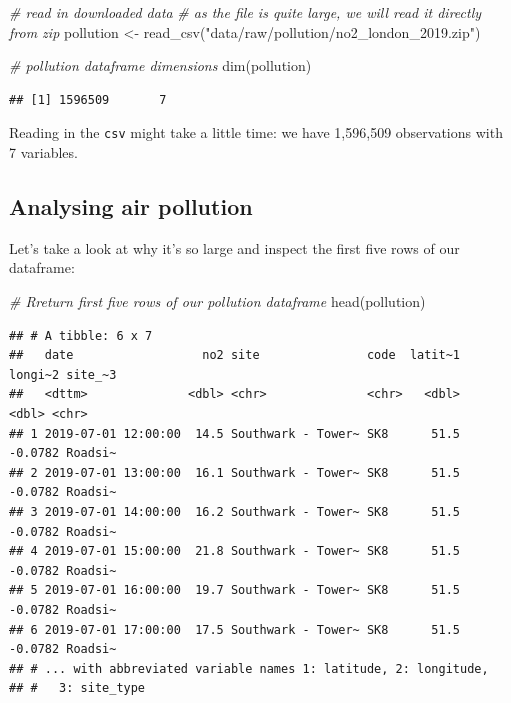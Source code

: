 \documentclass[
]{book}
\newenvironment{Shaded}{\begin{snugshade}}{\end{snugshade}}
\newcommand{\CommentTok}[1]{\textcolor[rgb]{0.56,0.35,0.01}{\textit{#1}}}
\newcommand{\FunctionTok}[1]{\textcolor[rgb]{0.00,0.00,0.00}{#1}}
\newcommand{\NormalTok}[1]{#1}
\newcommand{\OtherTok}[1]{\textcolor[rgb]{0.56,0.35,0.01}{#1}}
\newcommand{\StringTok}[1]{\textcolor[rgb]{0.31,0.60,0.02}{#1}}
\begin{document}
\begin{Shaded}
\begin{Highlighting}[]
\CommentTok{\# read in downloaded data}
\CommentTok{\# as the file is quite large, we will read it directly from zip}
\NormalTok{pollution }\OtherTok{\textless{}{-}} \FunctionTok{read\_csv}\NormalTok{(}\StringTok{"data/raw/pollution/no2\_london\_2019.zip"}\NormalTok{)}

\CommentTok{\# pollution dataframe dimensions}
\FunctionTok{dim}\NormalTok{(pollution)}
\end{Highlighting}
\end{Shaded}

\begin{verbatim}
## [1] 1596509       7
\end{verbatim}

Reading in the \texttt{csv} might take a little time: we have 1,596,509 observations with 7 variables.

\hypertarget{analysing-air-pollution}{%
\subsection{Analysing air pollution}\label{analysing-air-pollution}}

Let's take a look at why it's so large and inspect the first five rows of our dataframe:

\begin{Shaded}
\begin{Highlighting}[]
\CommentTok{\# Rreturn first five rows of our pollution dataframe}
\FunctionTok{head}\NormalTok{(pollution)}
\end{Highlighting}
\end{Shaded}

\begin{verbatim}
## # A tibble: 6 x 7
##   date                  no2 site               code  latit~1 longi~2 site_~3
##   <dttm>              <dbl> <chr>              <chr>   <dbl>   <dbl> <chr>  
## 1 2019-07-01 12:00:00  14.5 Southwark - Tower~ SK8      51.5 -0.0782 Roadsi~
## 2 2019-07-01 13:00:00  16.1 Southwark - Tower~ SK8      51.5 -0.0782 Roadsi~
## 3 2019-07-01 14:00:00  16.2 Southwark - Tower~ SK8      51.5 -0.0782 Roadsi~
## 4 2019-07-01 15:00:00  21.8 Southwark - Tower~ SK8      51.5 -0.0782 Roadsi~
## 5 2019-07-01 16:00:00  19.7 Southwark - Tower~ SK8      51.5 -0.0782 Roadsi~
## 6 2019-07-01 17:00:00  17.5 Southwark - Tower~ SK8      51.5 -0.0782 Roadsi~
## # ... with abbreviated variable names 1: latitude, 2: longitude,
## #   3: site_type
\end{verbatim}
\end{document}
